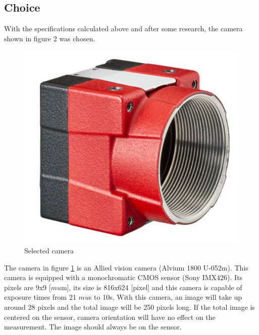\subsection{Choice}
With the specifications calculated above and after some research, the camera shown in figure 2 was chosen.
\begin{figure}[H]
    \centering
    \includegraphics[scale=0.35]{assets/figures/Mechanical Design/Camera.png}
    \caption{Selected camera}
    \label{fig:Camera2}
\end{figure}
The camera in figure \ref{fig:Camera2} is an Allied vision camera (Alvium 1800 U-052m). This camera is
equipped with a monochromatic CMOS sensor (Sony IMX426). Its pixels are 9x9 [$mu$m], its size is 816x624 [pixel]
and this camera is capable of exposure times from 21 $mu$s to 10s.
\bigbreak
With this camera, an image will take up around 28 pixels and the total image will be 250 pixels long.
If the total image is centered on the sensor, camera orientation will have no effect on the measurement.
The image should always be on the sensor.
\newpage
